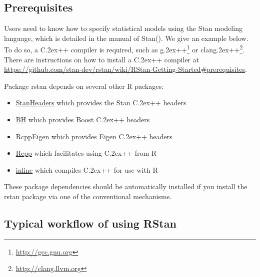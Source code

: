 \documentclass[12pt]{article}
\newcommand{\R}{R\xspace}
\newcommand{\Stan}{Stan\xspace}
\newcommand*{\Cpp}{C\raise.2ex\hbox{\footnotesize ++}\xspace} %
\newcommand{\gpp}{{\ttfamily g\raise.2ex\hbox{\footnotesize ++}}\xspace}
\newcommand{\clangpp}{{\ttfamily clang\raise.2ex\hbox{\footnotesize ++}}\xspace}
\newcommand{\strong}[1]{\texorpdfstring%
          {{\normalfont\fontseries{b}\selectfont #1}}%
            {#1}}
\let\pkg=\strong
\newcommand{\CRANpkg}[1]{\href{http://cran.r-project.org/package=#1}{\pkg{#1}}}%
\let\cpkg=\CRANpkg
\begin{document}
              \subsection{Prerequisites} 
              \label{subsec0pre}
              
              Users need to know how to specify statistical models 
              using the \Stan modeling language, which is detailed 
              in the manual of \Stan (\citealt{StanManual}).
              We give an example below. To do so, a \Cpp compiler is required, such as
              \gpp\footnote{\url{http://gcc.gnu.org}} or \clangpp\footnote{\url{http://clang.llvm.org}}.
              There are instructions on how to install a \Cpp compiler at 
              \url{https://github.com/stan-dev/rstan/wiki/RStan-Getting-Started#prerequisites}.
              
              Package \pkg{rstan} depends on several other \R packages: 
              \begin{itemize}
              \item \cpkg{StanHeaders} which provides the \Stan \Cpp headers
              \item \cpkg{BH} which provides Boost \Cpp headers
              \item \cpkg{RcppEigen} which provides Eigen \Cpp headers
              \item \cpkg{Rcpp} which facilitates using \Cpp from \R
              \item \cpkg{inline} which compiles \Cpp for use with \R
              \end{itemize}
              
              These package dependencies should be automatically installed if you
              install the \pkg{rstan} package via one of the conventional mechanisms.
              
              \subsection[Typical workflow of using RStan]{Typical workflow of using RStan}
              \label{subsec0workflow}
              
\end{document}
